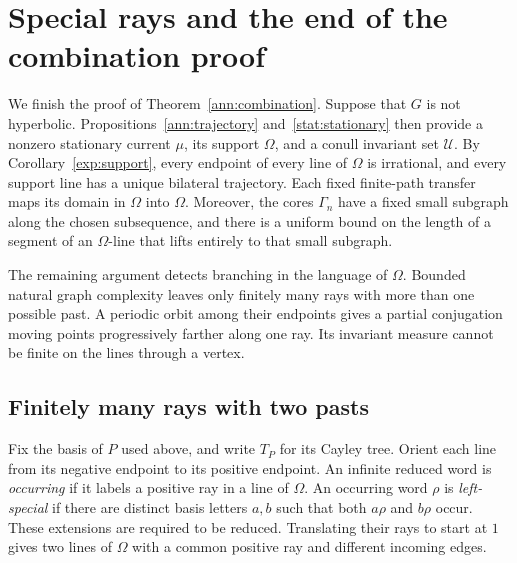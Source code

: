 \section{Special rays and the end of the combination proof}
\label{ray:section}

We finish the proof of Theorem~\ref{ann:combination}. Suppose that $G$
is not hyperbolic. Propositions~\ref{ann:trajectory}
and~\ref{stat:stationary} then provide a
nonzero stationary current $\mu$, its support $\Omega$, and a conull
invariant set $\mathcal U$. By Corollary~\ref{exp:support}, every endpoint
of every line of $\Omega$ is irrational, and every support line has a unique bilateral trajectory. Each fixed
finite-path transfer maps its domain in $\Omega$ into $\Omega$. Moreover, the cores
$\Gamma_n$ have a fixed small subgraph along the chosen subsequence, and
there is a uniform bound on the length of a segment of an $\Omega$-line
that lifts entirely to that small subgraph.

The remaining argument detects branching in the language of $\Omega$.
Bounded natural graph complexity leaves only finitely many rays with
more than one possible past. A periodic orbit among their endpoints
gives a partial conjugation moving points progressively farther along
one ray. Its invariant measure cannot be finite on the lines through
a vertex.

\subsection{Finitely many rays with two pasts}

Fix the basis of $P$ used above, and write $T_P$ for its Cayley tree.
Orient each line from its negative endpoint to its positive endpoint.
An infinite reduced word is \emph{occurring} if it labels a positive ray
in a line of $\Omega$. An occurring word $\rho$ is \emph{left-special}
if there are distinct basis letters $a,b$ such that both $a\rho$ and
$b\rho$ occur. These extensions are required to be reduced. Translating
their rays to start at $1$ gives two lines of $\Omega$ with a common
positive ray and different incoming edges.

